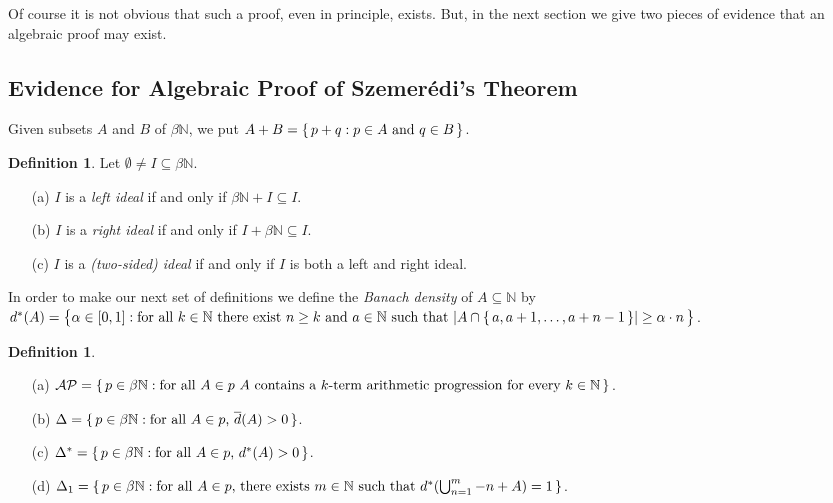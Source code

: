 \documentclass[12pt]{article}
\theoremstyle{plain}
\theoremstyle{definition}
\newtheorem{defn}[thm]{Definition}
\newcommand{\bbN}{\mathbb{N}}
\begin{document}
Of course it is not obvious that such a proof, even in principle,
exists.
But, in the next section we give two pieces of evidence that an
algebraic proof may exist. 

\subsection{Evidence for Algebraic Proof of Szemer\'{e}di's Theorem}
Given subsets $A$ and $B$ of $\beta\bbN$, we put $A+B = \{\, p + q : p
\in A \hbox{ and } q \in B \,\}$.
  \begin{defn}
    Let $\emptyset \ne I \subseteq \beta\bbN$.
      \begin{itemize}
        \item[(a)] $I$ is a \textsl{left ideal} if and only if
          $\beta\bbN + I \subseteq I$.
        \item[(b)] $I$ is a \textsl{right ideal} if and only if
          $I+\beta\bbN \subseteq I$.
        \item[(c)] $I$ is a \textsl{(two-sided) ideal} if and only if
          $I$ is both a left and right ideal.
      \end{itemize}
  \end{defn}
In order to make our next set of definitions we define the
\textsl{Banach density} of $A \subseteq \bbN$ by $d^*(A) = \bigl\{
\alpha \in [0,1] : \hbox{for all $k \in \bbN$}\hbox{ there exist $n
  \ge k$ and $a \in \bbN$}\hbox{ such that $|A \cap \{\,a, a+1,
  \ldots, a+n-1\,\}| \ge \alpha \cdot n$} \,\bigr\}$.

  \begin{defn}
    \begin{itemize}
      \item[(a)] $\mathcal{AP} = \{\, p \in \beta\bbN : \hbox{for all
          $A \in p$ $A$ contains a $k$-term arithmetic progression
          for every $k \in \bbN$} \,\}$.
      \item[(b)] $\Delta = \{\, p \in \beta\bbN : \hbox{for all $A \in
          p$, $\overline{d}(A) > 0$} \,\}$.
      \item[(c)] $\Delta^* = \{\, p \in \beta\bbN : \hbox{for all $A
          \in p$, $d^*(A) > 0$} \,\}$.
      \item[(d)] $\Delta_1 = \{\, p \in \beta\bbN : \hbox{for all $A
            \in p$, there exists $m \in \bbN$ such that
            $d^*(\bigcup_{n=1}^m -n+A) = 1$} \,\}$.
    \end{itemize}
  \end{defn}
\end{document}
